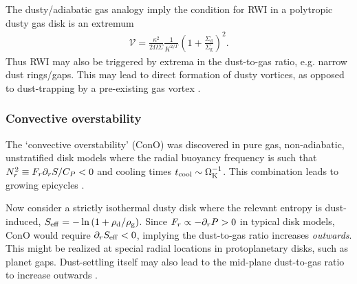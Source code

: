The dusty/adiabatic gas analogy imply the condition for RWI in a
polytropic dusty gas disk is an extremum   
\begin{align}
  \mathcal{V} =
  \frac{\kappa^2}{2\Omega\Sigma}\frac{1}{K^{2/\Gamma}}\left(1+
    \frac{\Sigma_\mathrm{d}}{\Sigma_\mathrm{g}}\right)^2.    
\end{align}
Thus RWI may also be triggered by extrema 
in the dust-to-gas ratio, e.g. narrow dust rings/gaps. This may lead 
to direct formation of dusty vortices, as opposed to dust-trapping by  
a pre-existing gas vortex \citep{barge95,lyra13}.  



\subsubsection{Convective overstability}
The `convective overstability' (ConO) was discovered in pure gas, non-adiabatic, unstratified disk models    
where the radial buoyancy frequency is such that $N_r^2\equiv
F_r\partial_rS/C_P  < 0 $ and cooling times $t_\mathrm{cool}\sim \Omega_{\rm K}^{-1}$. This
combination leads to growing epicycles
\citep{klahr14,lyra14,latter16}.     


Now consider a strictly isothermal dusty disk where the relevant 
entropy is dust-induced, $S_\mathrm{eff} =-\ln{(1+\rho_\mathrm{d}/\rho_\mathrm{g})}$. 
Since $F_r\propto -\partial_rP > 0$ in typical disk models, ConO would
require $\partial_rS_\mathrm{eff}<0$, implying the dust-to-gas ratio increases
\emph{outwards}. This might be realized at special radial locations in 
protoplanetary disks, such as planet gaps. Dust-settling itself may
also lead to the mid-plane dust-to-gas ratio to increase outwards
\citep{takeuchi02}. 


